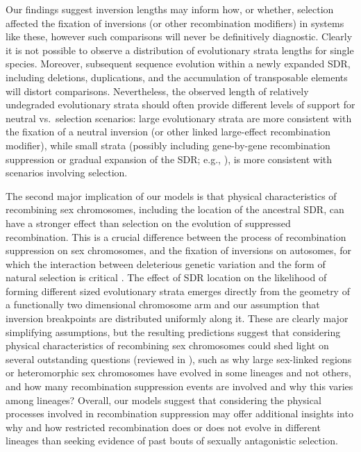 \documentclass{article}
\begin{document}
Our findings suggest inversion lengths may inform how, or whether, selection affected the fixation of inversions (or other recombination modifiers) in  systems like these, however such comparisons will never be definitively diagnostic. Clearly it is not possible to observe a distribution of evolutionary strata lengths for single species. Moreover, subsequent sequence evolution within a newly expanded SDR, including deletions, duplications, and the accumulation of transposable elements will distort comparisons. Nevertheless, the observed length of relatively undegraded evolutionary strata should often provide different levels of support for neutral vs.~selection scenarios: large evolutionary strata are more consistent with the fixation of a neutral inversion (or other linked large-effect recombination modifier), while small strata (possibly including gene-by-gene recombination suppression or gradual expansion of the SDR; e.g., \citealt{BergeroQiuCharlesworth2013, QiuBergeroCharlesworth2015}), is more consistent with scenarios involving selection. 

The second major implication of our models is that physical characteristics of recombining sex chromosomes, including the location of the ancestral SDR, can have a stronger effect than selection on the evolution of suppressed recombination. This is a crucial difference between the process of recombination suppression on sex chromosomes, and the fixation of inversions on autosomes, for which the interaction between deleterious genetic variation and the form of natural selection is critical \citep{ConnallonOlito2020}. The effect of SDR location on the likelihood of forming different sized evolutionary strata emerges directly from the geometry of a functionally two dimensional chromosome arm and our assumption that inversion breakpoints are distributed uniformly along it. These are clearly major simplifying assumptions, but the resulting predictions suggest that considering physical characteristics of recombining sex chromosomes could shed light on several outstanding questions (reviewed in \citealt{Charlesworth2016, Charlesworth2017}), such as why large sex-linked regions or heteromorphic sex chromosomes have evolved in some lineages and not others, and how many recombination suppression events are involved and why this varies among lineages? Overall, our models suggest that considering the physical processes involved in recombination suppression may offer additional insights into why and how restricted recombination does or does not evolve in different lineages than seeking evidence of past bouts of sexually antagonistic selection.
\end{document}
